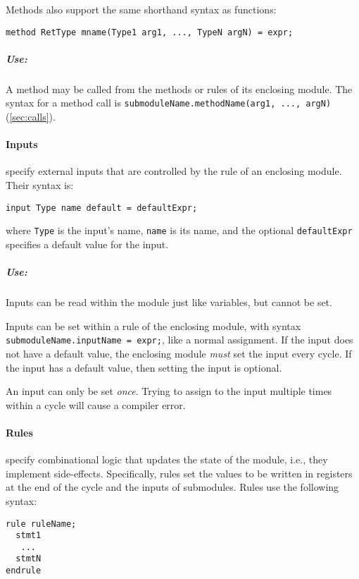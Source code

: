 Methods also support the same shorthand syntax as functions:
\begin{center}
\verb|method RetType mname(Type1 arg1, ..., TypeN argN) = expr;|
\end{center}


\subparagraph{Use:}
A method may be called from the methods or rules of its enclosing module.
The syntax for a method call is
\verb|submoduleName.methodName(arg1, ..., argN)|
(\autoref{sec:calls}).


\paragraph{Inputs} specify external inputs that are controlled by
the rule of an enclosing module. Their syntax is:
\begin{center}
\verb|input Type name |\optStart\verb|default = defaultExpr|\optEnd\verb|;|
\end{center}
where \verb|Type| is the input's name,
\verb|name| is its name,
and the optional \verb|defaultExpr| specifies a default value for the input.

\subparagraph{Use:}
Inputs can be read within the module just like variables, but cannot be set.

Inputs can be set within a rule of the enclosing module,
with syntax \verb|submoduleName.inputName = expr;|, like a normal assignment.
If the input does not have a default value,
the enclosing module \emph{must} set the input every cycle.
If the input has a default value, then setting the input is optional.

An input can only be set \emph{once}. Trying to assign to the input multiple
times within a cycle will cause a compiler error.


\paragraph{Rules} specify combinational logic that updates the state of the module,
i.e., they implement side-effects.
Specifically, rules set the values to be written in registers
at the end of the cycle and the inputs of submodules.
Rules use the following syntax:
\begin{center}
  \verb|rule ruleName;| \\
  \verb|  stmt1       | \\
  \verb|   ...        | \\
  \verb|  stmtN       | \\
  \verb|endrule       |
\end{center}

